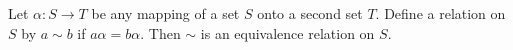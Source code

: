 Let $\alpha : S \to T$ be any mapping of a set $S$ onto a second set $T$. Define a relation on $S$ by $a \sim b$ if $a\alpha = b\alpha$. Then $\sim$ is an equivalence relation on $S$.
